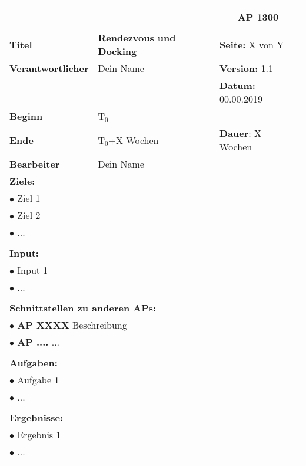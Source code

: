 \begin{table}[!h]
 \begin{center}
  \begin{tabular}{|p{35mm}||p{55mm}|p{50mm}||p{40mm}|}
   \hline
   \multicolumn{3}{|l||}{\textbf{}} & \multicolumn{1}{c|}{}\\
   \multicolumn{3}{|l||}{\textbf{}} & \multicolumn{1}{c|}{\textbf{AP 1300}}\\
   \multicolumn{3}{|l||}{\textbf{}} & \multicolumn{1}{c|}{}\\
   \hline\hline
   \textbf{Titel} & \multicolumn{2}{p{7cm}||}{\textbf{Rendezvous und Docking}} & \textbf{Seite:} X von Y\\
   \hline
   \textbf{Verantwortlicher} & \multicolumn{2}{l||}{Dein Name} & \textbf{Version:} 1.1\\
   \hline
   \multicolumn{3}{|l||}{} & \textbf{Datum:} 00.00.2019\\
   \hline\hline
   \textbf{Beginn} & \multicolumn{2}{l||}{T$_0$} & \\
   \hline
   \textbf{Ende} & \multicolumn{2}{l||}{T$_0$+X Wochen} & \textbf{Dauer}: X Wochen\\
   \hline\hline
   \textbf{Bearbeiter} & \multicolumn{3}{l|}{Dein Name}\\
   \hline\hline
   \multicolumn{4}{|p{150mm}|}{\textbf{Ziele:}}\\
   \multicolumn{4}{|p{150mm}|}{$\bullet$ Ziel 1}\\
   \multicolumn{4}{|p{150mm}|}{$\bullet$ Ziel 2}\\
   \multicolumn{4}{|p{150mm}|}{$\bullet$ ...}\\
   \multicolumn{4}{|p{150mm}|}{}\\
   \multicolumn{4}{|p{150mm}|}{\textbf{Input:}}\\
   \multicolumn{4}{|p{150mm}|}{$\bullet$ Input 1}\\
   \multicolumn{4}{|p{150mm}|}{$\bullet$ ...}\\
   \multicolumn{4}{|p{150mm}|}{}\\
   \multicolumn{4}{|p{150mm}|}{\textbf{Schnittstellen zu anderen APs:}}\\
   \multicolumn{4}{|p{150mm}|}{$\bullet$ \textbf{AP XXXX} Beschreibung}\\
   \multicolumn{4}{|p{150mm}|}{$\bullet$ \textbf{AP ....} ...}\\
   \multicolumn{4}{|p{150mm}|}{}\\
   \multicolumn{4}{|p{150mm}|}{\textbf{Aufgaben:}}\\
   \multicolumn{4}{|p{150mm}|}{$\bullet$ Aufgabe 1}\\
   \multicolumn{4}{|p{150mm}|}{$\bullet$ ...}\\
   \multicolumn{4}{|p{150mm}|}{}\\
   \multicolumn{4}{|p{150mm}|}{\textbf{Ergebnisse:}}\\
   \multicolumn{4}{|p{150mm}|}{$\bullet$ Ergebnis 1}\\
   \multicolumn{4}{|p{150mm}|}{$\bullet$ ...}\\
   \hline
  \end{tabular}
 \end{center}
\end{table}

